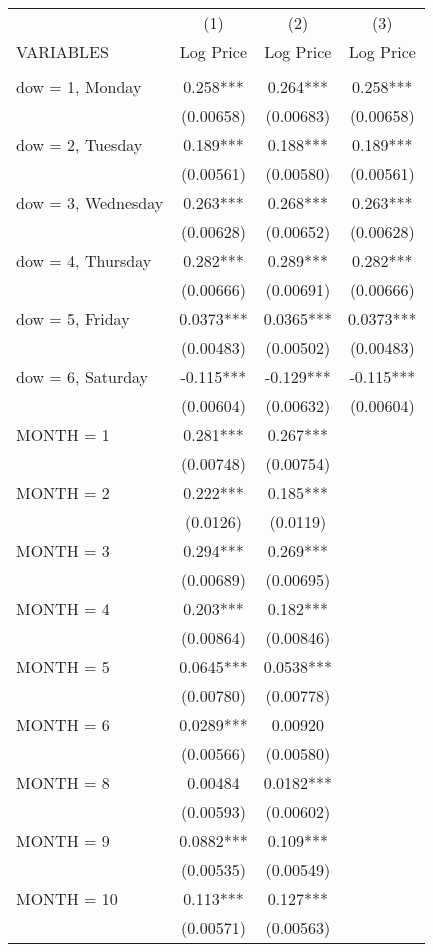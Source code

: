 \begin{tabular}{lccc} \hline
 & (1) & (2) & (3) \\
VARIABLES & Log Price & Log Price & Log Price \\ \hline
 &  &  &  \\
dow = 1, Monday & 0.258*** & 0.264*** & 0.258*** \\
 & (0.00658) & (0.00683) & (0.00658) \\
dow = 2, Tuesday & 0.189*** & 0.188*** & 0.189*** \\
 & (0.00561) & (0.00580) & (0.00561) \\
dow = 3, Wednesday & 0.263*** & 0.268*** & 0.263*** \\
 & (0.00628) & (0.00652) & (0.00628) \\
dow = 4, Thursday & 0.282*** & 0.289*** & 0.282*** \\
 & (0.00666) & (0.00691) & (0.00666) \\
dow = 5, Friday & 0.0373*** & 0.0365*** & 0.0373*** \\
 & (0.00483) & (0.00502) & (0.00483) \\
dow = 6, Saturday & -0.115*** & -0.129*** & -0.115*** \\
 & (0.00604) & (0.00632) & (0.00604) \\
MONTH = 1 & 0.281*** & 0.267*** &  \\
 & (0.00748) & (0.00754) &  \\
MONTH = 2 & 0.222*** & 0.185*** &  \\
 & (0.0126) & (0.0119) &  \\
MONTH = 3 & 0.294*** & 0.269*** &  \\
 & (0.00689) & (0.00695) &  \\
MONTH = 4 & 0.203*** & 0.182*** &  \\
 & (0.00864) & (0.00846) &  \\
MONTH = 5 & 0.0645*** & 0.0538*** &  \\
 & (0.00780) & (0.00778) &  \\
MONTH = 6 & 0.0289*** & 0.00920 &  \\
 & (0.00566) & (0.00580) &  \\
MONTH = 8 & 0.00484 & 0.0182*** &  \\
 & (0.00593) & (0.00602) &  \\
MONTH = 9 & 0.0882*** & 0.109*** &  \\
 & (0.00535) & (0.00549) &  \\
MONTH = 10 & 0.113*** & 0.127*** &  \\
 & (0.00571) & (0.00563) &  \\

\end{tabular}
